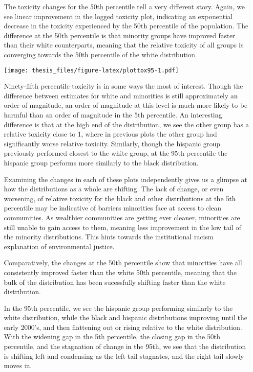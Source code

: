 \documentclass[12pt,twoside]{dukestatscithesis}
\theoremstyle{definition}
\theoremstyle{definition}
\theoremstyle{definition}
\theoremstyle{remark}
\begin{document}
The toxicity changes for the 50th percentile tell a very different
story. Again, we see linear improvement in the logged toxicity plot,
indicating an exponential decrease in the toxicity experienced by the
50th percentile of the population. The difference at the 50th percentile
is that minority groups have improved faster than their white
counterparts, meaning that the relative toxicity of all groups is
converging towards the 50th percentile of the white distribution.

\texttt{[image: thesis\_files/figure-latex/plottox95-1.pdf]}

Ninety-fifth percentile toxicity is in some ways the most of interest.
Though the difference between estimates for white and minorities is
still approximately an order of magnitude, an order of magnitude at this
level is much more likely to be harmful than an order of magnitude in
the 5th percentile. An interesting difference is that at the high end of
the distribution, we see the other group has a relative toxicity close
to 1, where in previous plots the other group had significantly worse
relative toxicity. Similarly, though the hispanic group previously
performed closest to the white group, at the 95th percentile the
hispanic group performs more similarly to the black distribution.

Examining the changes in each of these plots independently gives us a
glimpse at how the distributions as a whole are shifting. The lack of
change, or even worsening, of relative toxicity for the black and other
distributions at the 5th percentile may be indicative of barriers
minorities face at access to clean communities. As wealthier communities
are getting ever cleaner, minorities are still unable to gain access to
them, meaning less improvement in the low tail of the minority
distributions. This hints towards the institutional racism explanation
of environmental justice.

Comparatively, the changes at the 50th percentile show that minorities
have all consistently improved faster than the white 50th percentile,
meaning that the bulk of the distribution has been sucessfully shifting
faster than the white distribution.

In the 95th percentile, we see the hispanic group performing similarly
to the white distribution, while the black and hispanic distributions
improving until the early 2000's, and then flattening out or rising
relative to the white distribution. With the widening gap in the 5th
percentile, the closing gap in the 50th percentile, and the stagnation
of change in the 95th, we see that the distribution is shifting left and
condensing as the left tail stagnates, and the right tail slowly moves
in.
\end{document}
